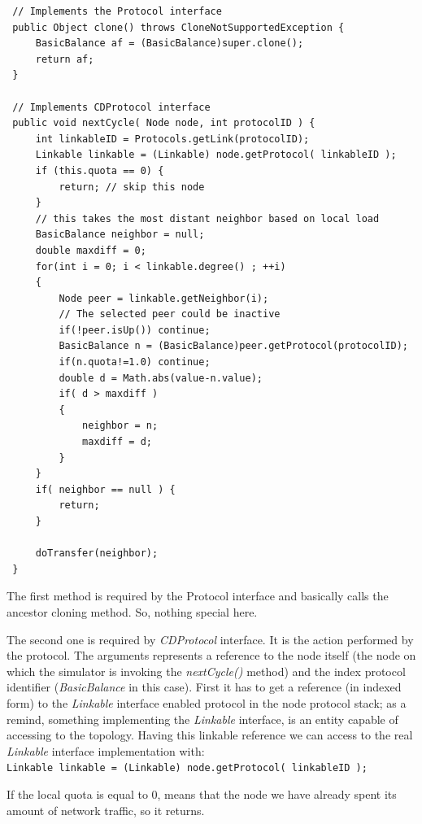 \documentclass[a4paper,11pt]{article}
\begin{document}
\footnotesize
\begin{verbatim}
 // Implements the Protocol interface
 public Object clone() throws CloneNotSupportedException {
     BasicBalance af = (BasicBalance)super.clone();
     return af;
 }
 
 // Implements CDProtocol interface
 public void nextCycle( Node node, int protocolID ) {
     int linkableID = Protocols.getLink(protocolID);
     Linkable linkable = (Linkable) node.getProtocol( linkableID );
     if (this.quota == 0) {
         return; // skip this node
     }    
     // this takes the most distant neighbor based on local load
     BasicBalance neighbor = null;
     double maxdiff = 0;
     for(int i = 0; i < linkable.degree() ; ++i)
     {
         Node peer = linkable.getNeighbor(i);
         // The selected peer could be inactive
         if(!peer.isUp()) continue; 
         BasicBalance n = (BasicBalance)peer.getProtocol(protocolID);
         if(n.quota!=1.0) continue;
         double d = Math.abs(value-n.value);
         if( d > maxdiff )
         {
             neighbor = n;
             maxdiff = d;
         }
     }
     if( neighbor == null ) {
         return;
     }
                 
     doTransfer(neighbor);
 }
\end{verbatim}
\normalsize


The first method is required by the Protocol interface and basically
calls the ancestor cloning method. So, nothing special here.

The second one is required by \emph{CDProtocol} interface. It is the
action performed by the protocol. The arguments represents a reference
to the node itself (the node on which the simulator is invoking the
\emph{nextCycle()} method) and the index protocol identifier (\emph{BasicBalance}
in this case). First it has to get a reference (in indexed form) to
the \emph{Linkable} interface enabled protocol in the node protocol
stack; as a remind, something implementing the \emph{Linkable} interface,
is an entity capable of accessing to the topology. Having this linkable
reference we can access to the real \emph{Linkable} interface
implementation with: \\


\texttt{\footnotesize Linkable linkable = (Linkable) node.getProtocol(
linkableID );}~\\
{\footnotesize \par}

If the local quota is equal to 0, means that the node we have already
spent its amount of network traffic, so it returns.
\end{document}
